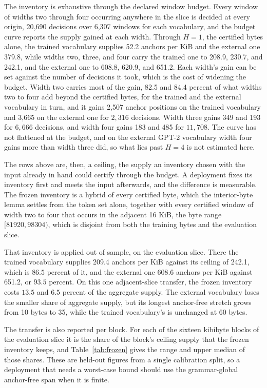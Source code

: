 \documentclass[11pt,a4paper]{article}
\theoremstyle{definition}
\theoremstyle{plain}
\begin{document}
The inventory is exhaustive through the declared window budget. Every window of widths two through four occurring
anywhere in the slice is decided at every origin, 20{,}690 decisions over 6{,}307 windows for each vocabulary, and the
budget curve reports the supply gained at each width. Through $H = 1$, the certified bytes alone, the trained vocabulary
supplies 52.2 anchors per KiB and the external one 379.8, while widths two, three, and four carry the trained one to
208.9, 230.7, and 242.1, and the external one to 608.8, 620.9, and 651.2. Each width's gain can be set against the
number of decisions it took, which is the cost of widening the budget. Width two carries most of the gain, 82.5 and 84.4
percent of what widths two to four add beyond the certified bytes, for the trained and the external vocabulary in turn,
and it gains 2{,}507 anchor positions on the trained vocabulary and 3{,}665 on the external one for $2{,}316$ decisions.
Width three gains 349 and 193 for $6{,}666$ decisions, and width four gains 183 and 485 for $11{,}708$. The curve has
not flattened at the budget, and on the external GPT-2 vocabulary width four gains more than width three did, so what
lies past $H = 4$ is not estimated here.

The rows above are, then, a ceiling, the supply an inventory chosen with the input already in hand could certify through
the budget. A deployment fixes its inventory first and meets the input afterwards, and the difference is measurable. The
frozen inventory is a hybrid of every certified byte, which the interior-byte lemma settles from the token set alone,
together with every certified window of width two to four that occurs in the adjacent 16 KiB, the byte range
$[81920, 98304)$, which is disjoint from both the training bytes and the evaluation slice.

That inventory is applied out of sample, on the evaluation slice. There the trained vocabulary supplies 209.4 anchors
per KiB against its ceiling of 242.1, which is $86.5$ percent of it, and the external one 608.6 anchors per KiB against
651.2, or $93.5$ percent. On this one adjacent-slice transfer, the frozen inventory costs $13.5$ and $6.5$ percent of
the aggregate supply. The external vocabulary loses the smaller share of aggregate supply, but its longest anchor-free
stretch grows from 10 bytes to 35, while the trained vocabulary's is unchanged at 60 bytes.

The transfer is also reported per block. For each of the sixteen kibibyte blocks of the evaluation slice it is the share
of the block's ceiling supply that the frozen inventory keeps, and Table~\ref{tab:frozen} gives the range and upper
median of those shares. These are held-out figures from a single calibration split, so a deployment that needs a
worst-case bound should use the grammar-global anchor-free span when it is finite.
\end{document}
